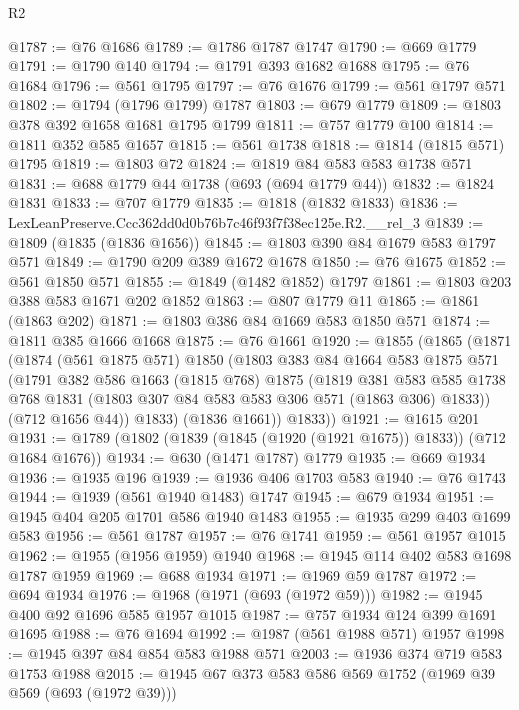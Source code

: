 \begin{lexlean}{R2}
\begin{coremodule}
@1787 := @76 @1686
@1789 := @1786 @1787 @1747
@1790 := @669 @1779
@1791 := @1790 @140
@1794 := @1791 @393 @1682 @1688
@1795 := @76 @1684
@1796 := @561 @1795
@1797 := @76 @1676
@1799 := @561 @1797 @571
@1802 := @1794 (@1796 @1799) @1787
@1803 := @679 @1779
@1809 := @1803 @378 @392 @1658 @1681 @1795 @1799
@1811 := @757 @1779 @100
@1814 := @1811 @352 @585 @1657
@1815 := @561 @1738
@1818 := @1814 (@1815 @571) @1795
@1819 := @1803 @72
@1824 := @1819 @84 @583 @583 @1738 @571
@1831 := @688 @1779 @44 @1738 (@693 (@694 @1779 @44))
@1832 := @1824 @1831
@1833 := @707 @1779
@1835 := @1818 (@1832 @1833)
@1836 := LexLeanPreserve.Ccc362dd0d0b76b7c46f93f7f38ec125e.R2.__rel_3
@1839 := @1809 (@1835 (@1836 @1656))
@1845 := @1803 @390 @84 @1679 @583 @1797 @571
@1849 := @1790 @209 @389 @1672 @1678
@1850 := @76 @1675
@1852 := @561 @1850 @571
@1855 := @1849 (@1482 @1852) @1797
@1861 := @1803 @203 @388 @583 @1671 @202 @1852
@1863 := @807 @1779 @11
@1865 := @1861 (@1863 @202)
@1871 := @1803 @386 @84 @1669 @583 @1850 @571
@1874 := @1811 @385 @1666 @1668
@1875 := @76 @1661
@1920 := @1855
    (@1865
      (@1871
        (@1874
          (@561 @1875 @571)
          @1850
          (@1803
            @383
            @84
            @1664
            @583
            @1875
            @571
            (@1791
              @382
              @586
              @1663
              (@1815 @768)
              @1875
              (@1819
                @381
                @583
                @585
                @1738
                @768
                @1831
                (@1803 @307 @84 @583 @583 @306 @571 (@1863 @306) @1833))
              (@712 @1656 @44))
            @1833)
          (@1836 @1661))
        @1833))
@1921 := @1615 @201
@1931 := @1789 (@1802 (@1839 (@1845 (@1920 (@1921 @1675)) @1833)) (@712 @1684 @1676))
@1934 := @630 (@1471 @1787) @1779
@1935 := @669 @1934
@1936 := @1935 @196
@1939 := @1936 @406 @1703 @583
@1940 := @76 @1743
@1944 := @1939 (@561 @1940 @1483) @1747
@1945 := @679 @1934
@1951 := @1945 @404 @205 @1701 @586 @1940 @1483
@1955 := @1935 @299 @403 @1699 @583
@1956 := @561 @1787
@1957 := @76 @1741
@1959 := @561 @1957 @1015
@1962 := @1955 (@1956 @1959) @1940
@1968 := @1945 @114 @402 @583 @1698 @1787 @1959
@1969 := @688 @1934
@1971 := @1969 @59 @1787
@1972 := @694 @1934
@1976 := @1968 (@1971 (@693 (@1972 @59)))
@1982 := @1945 @400 @92 @1696 @585 @1957 @1015
@1987 := @757 @1934 @124 @399 @1691 @1695
@1988 := @76 @1694
@1992 := @1987 (@561 @1988 @571) @1957
@1998 := @1945 @397 @84 @854 @583 @1988 @571
@2003 := @1936 @374 @719 @583 @1753 @1988
@2015 := @1945 @67 @373 @583 @586 @569 @1752 (@1969 @39 @569 (@693 (@1972 @39)))

\end{coremodule}
\end{lexlean}
